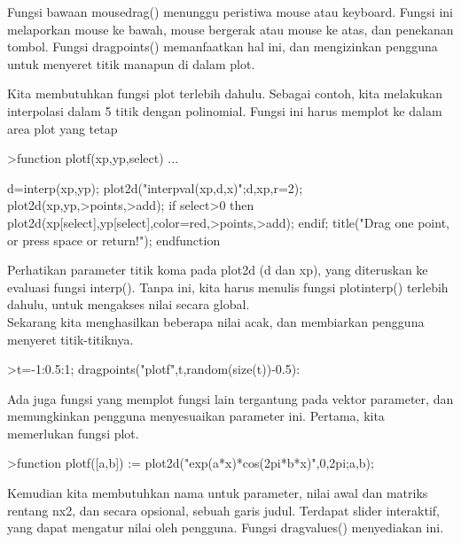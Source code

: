 \documentclass[a4paper,10pt]{article}
\begin{document}
\begin{eulernotebook}
\begin{eulercomment}
\begin{eulercomment}
\begin{eulercomment}
Fungsi bawaan mousedrag() menunggu peristiwa mouse atau keyboard.
Fungsi ini melaporkan mouse ke bawah, mouse bergerak atau mouse ke
atas, dan penekanan tombol. Fungsi dragpoints() memanfaatkan hal ini,
dan mengizinkan pengguna untuk menyeret titik manapun di dalam plot. 

Kita membutuhkan fungsi plot terlebih dahulu. Sebagai contoh, kita
melakukan interpolasi dalam 5 titik dengan polinomial. Fungsi ini
harus memplot ke dalam area plot yang tetap
\end{eulercomment}
\begin{eulerprompt}
>function plotf(xp,yp,select) ...
\end{eulerprompt}
\begin{eulerudf}
  d=interp(xp,yp);
  plot2d("interpval(xp,d,x)";d,xp,r=2);
  plot2d(xp,yp,>points,>add);
  if select>0 then 
    plot2d(xp[select],yp[select],color=red,>points,>add);
  endif;
  title("Drag one point, or press space or return!");
  endfunction
\end{eulerudf}
\begin{eulercomment}
Perhatikan parameter titik koma pada plot2d (d dan xp), yang
diteruskan ke evaluasi fungsi interp(). Tanpa ini, kita harus menulis
fungsi plotinterp() terlebih dahulu, untuk mengakses nilai secara
global. \\
Sekarang kita menghasilkan beberapa nilai acak, dan membiarkan
pengguna menyeret titik-titiknya. 
\end{eulercomment}
\begin{eulerprompt}
>t=-1:0.5:1; dragpoints("plotf",t,random(size(t))-0.5):
\end{eulerprompt}
\begin{eulercomment}
Ada juga fungsi yang memplot fungsi lain tergantung pada vektor
parameter, dan memungkinkan pengguna menyesuaikan parameter ini.
Pertama, kita memerlukan fungsi plot.
\end{eulercomment}
\begin{eulerprompt}
>function plotf([a,b]) := plot2d("exp(a*x)*cos(2pi*b*x)",0,2pi;a,b);
\end{eulerprompt}
\begin{eulercomment}
Kemudian kita membutuhkan nama untuk parameter, nilai awal dan matriks
rentang nx2, dan secara opsional, sebuah garis judul. Terdapat slider
interaktif, yang dapat mengatur nilai oleh pengguna. Fungsi
dragvalues() menyediakan ini.
\end{eulercomment}

\end{eulercomment}
\end{eulercomment}
\end{eulernotebook}
\end{document}
